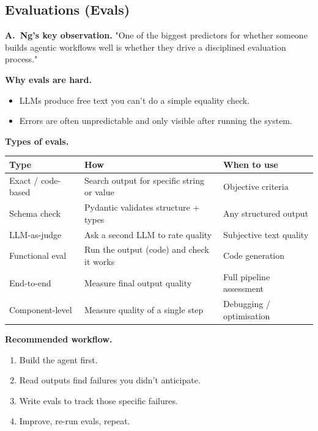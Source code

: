 \documentclass[a4paper,11pt]{article}
\begin{document}
\subsection{Evaluations (Evals)}

\begin{ambercallout}
\textbf{A.\ Ng's key observation.}
"One of the biggest predictors for whether someone builds agentic
workflows well is whether they drive a disciplined evaluation
process."
\end{ambercallout}

\textbf{Why evals are hard.}
\begin{itemize}[noitemsep, leftmargin=1.2em]
  \item LLMs produce free text \textemdash{} you can't do a simple
        equality check.
  \item Errors are often unpredictable and only visible after running
        the system.
\end{itemize}

\textbf{Types of evals.}

\begin{center}\small
\begin{tabular}{p{3.5cm} p{5.2cm} p{4.2cm}}
  \toprule
  \textbf{Type} & \textbf{How} & \textbf{When to use} \\
  \midrule
  Exact / code-based   & Search output for specific string or value     & Objective criteria \\
  Schema check         & Pydantic validates structure + types           & Any structured output \\
  LLM-as-judge         & Ask a second LLM to rate quality               & Subjective text quality \\
  Functional eval      & Run the output (code) and check it works       & Code generation \\
  End-to-end           & Measure final output quality                   & Full pipeline assessment \\
  Component-level      & Measure quality of a single step               & Debugging / optimisation \\
  \bottomrule
\end{tabular}
\end{center}

\textbf{Recommended workflow.}
\begin{enumerate}[noitemsep, leftmargin=1.4em]
  \item Build the agent first.
  \item Read outputs \textemdash{} find failures you didn't anticipate.
  \item Write evals to track those specific failures.
  \item Improve, re-run evals, repeat.
\end{enumerate}
\end{document}
